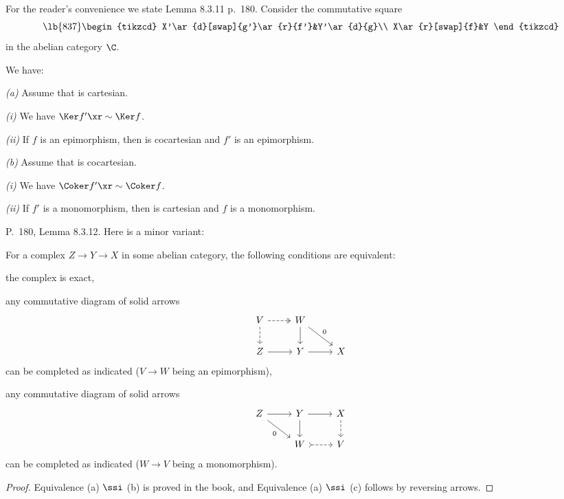 \documentclass[12pt]{article}
\theoremstyle{remark}
\theoremstyle{definition}
\begin{document}
\begin{s} 
For the reader's convenience we state Lemma 8.3.11 p.~180. Consider the commutative square 
\begin{equation}\lb{837}
\begin{tikzcd}
X'\ar{d}[swap]{g'}\ar{r}{f'}&Y'\ar{d}{g}\\ 
X\ar{r}[swap]{f}&Y
\end{tikzcd}
\end{equation} 
in the abelian category $\C$. 

\begin{lem}[Lemma 8.3.11 p.~180]
We have:

\nn\emph{(a)} Assume that  is cartesian. 

\emph{(i)} We have $\Ker f'\xr\sim\Ker f$. 

\emph{(ii)} If $f$ is an epimorphism, then  is cocartesian and $f'$ is an epimorphism.

\nn\emph{(b)} Assume that  is cocartesian.

\emph{(i)} We have $\Coker f'\xr\sim\Coker f$.

\emph{(ii)} If $f'$ is a monomorphism, then  is cartesian and $f$ is a
monomorphism.
\end{lem} 
\end{s} 

%

\begin{s}
P.~180, Lemma 8.3.12. Here is a minor variant:

\begin{lem}
For a complex $Z\to Y\to X$ in some abelian category, the following conditions are equivalent:

 the complex is exact,

 any commutative diagram of solid arrows
$$
\begin{tikzcd}
V\ar[dashed]{d}\ar[dashed, two heads]{r}&W\ar{dr}{0}\ar{d}\\ 
Z\ar{r}&Y\ar{r}&X
\end{tikzcd}
$$ 
can be completed as indicated ($V\to W$ being an epimorphism),

 any commutative diagram of solid arrows
$$
\begin{tikzcd}
Z\ar{dr}[swap]{0}\ar{r}&Y\ar{d}\ar{r}&X\ar[dashed]{d}\\ 
{}&W\ar[tail,dashed]{r}&V
\end{tikzcd}
$$ 
can be completed as indicated ($W\to V$ being a monomorphism).
\end{lem}

\begin{proof}
Equivalence (a) $\ssi$ (b) is proved in the book, and Equivalence (a) $\ssi$ (c) follows by reversing arrows.
\end{proof}
\end{s}
\end{document}

